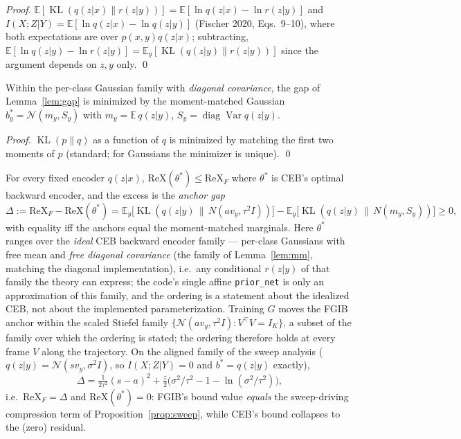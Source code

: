 \begin{proof}
$\mathbb{E}[\operatorname{KL}(q(z|x)\|r(z|y))] = \mathbb{E}[\ln q(z|x) - \ln r(z|y)]$
and $I(X;Z|Y) = \mathbb{E}[\ln q(z|x) - \ln q(z|y)]$ (Fischer 2020, Eqs.~9--10), where
both expectations are over $p(x,y)q(z|x)$; subtracting,
$\mathbb{E}[\ln q(z|y) - \ln r(z|y)] = \mathbb{E}_y[\operatorname{KL}(q(z|y)\|r(z|y))]$
since the argument depends on $z, y$ only. \hfill\qed
\end{proof}

\begin{lemma}\label{lem:mm}
Within the per-class Gaussian family with \emph{diagonal covariance}, the gap of
Lemma~\ref{lem:gap} is
minimized by the moment-matched Gaussian $b^*_y = \mathcal{N}(m_y, S_y)$ with
$m_y = \mathbb{E}\,q(z|y)$, $S_y = \operatorname{diag}\operatorname{Var} q(z|y)$.
\end{lemma}

\begin{proof}
$\operatorname{KL}(p\|q)$ as a function of $q$ is minimized by matching the first two
moments of $p$ (standard; for Gaussians the minimizer is unique). \hfill\qed
\end{proof}

\begin{proposition}\label{prop:ordering}
For every fixed encoder $q(z|x)$,
$\mathrm{ReX}(\theta^*) \le \mathrm{ReX}_F$ where $\theta^*$ is CEB's optimal backward
encoder, and the excess is the \emph{anchor gap}
\begin{equation}
\Delta := \mathrm{ReX}_F - \mathrm{ReX}(\theta^*)
= \mathbb{E}_y\big[\operatorname{KL}(q(z|y)\,\|\,N(a v_y, \tau^2 I))\big]
- \mathbb{E}_y\big[\operatorname{KL}(q(z|y)\,\|\,N(m_y, S_y))\big] \ge 0 ,
\label{eq:anchor-gap}
\end{equation}
with equality iff the anchors equal the moment-matched marginals. Here $\theta^*$ ranges
over the \emph{ideal} CEB backward encoder family --- per-class Gaussians with free mean
and \emph{free diagonal covariance} (the family of Lemma~\ref{lem:mm}, matching the
diagonal implementation), i.e.\ any conditional $r(z|y)$ of that family the theory can
express; the code's
single affine \texttt{prior\_net} is only an approximation of this family, and the
ordering is a statement about the idealized CEB, not about the implemented
parameterization. Training $G$ moves the FGIB anchor within the scaled Stiefel family
$\{\mathcal{N}(a v_y, \tau^2 I) : V^{\top}V = I_K\}$, a subset of the family over which
the ordering is stated; the ordering therefore holds at every frame $V$ along the
trajectory.
On the aligned family of the sweep analysis ($q(z|y) = \mathcal{N}(s v_y, \sigma^2 I)$,
so $I(X;Z|Y) = 0$ and $b^* = q(z|y)$ exactly),
\begin{equation}
\Delta = \tfrac{1}{2\tau^2}(s-a)^2 + \tfrac{z}{2}\big(\sigma^2/\tau^2 - 1 - \ln(\sigma^2/\tau^2)\big) ,
\label{eq:aligned-gap}
\end{equation}
i.e.\ $\mathrm{ReX}_F = \Delta$ and $\mathrm{ReX}(\theta^*) = 0$: FGIB's bound value
\emph{equals} the sweep-driving compression term of Proposition~\ref{prop:sweep}, while
CEB's bound collapses to the (zero) residual.
\end{proposition}


